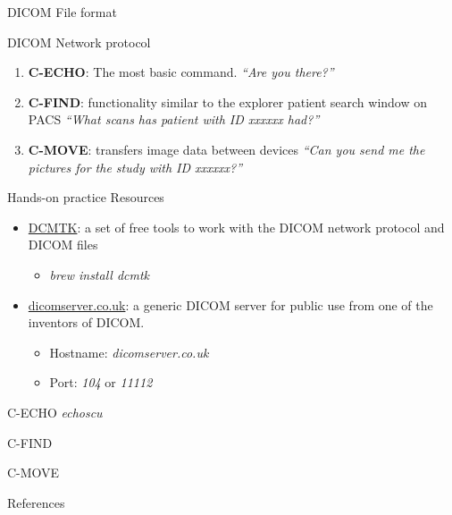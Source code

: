 \documentclass{beamer}
\begin{document}
\begin{frame}{DICOM File format}
\end{frame}

\begin{frame}{DICOM Network protocol}
    \begin{enumerate}
        \item{\textbf{C-ECHO}: The most basic command. \textit{``Are you there?''}}
        \item{\textbf{C-FIND}: functionality similar to the explorer patient search window on PACS \textit{``What scans has patient with ID xxxxxx had?''}}
        \item{\textbf{C-MOVE}: transfers image data between devices \textit{``Can you send me the pictures for the study with ID xxxxxx?''}}
    \end{enumerate}
\end{frame}

\begin{frame}{Hands-on practice}
    Resources
    \begin{itemize}
        \item{\href{https://dcmtk.org/}{DCMTK}: a set of free tools to work with the DICOM network protocol and DICOM files}
            \begin{itemize}
                \item{\textit{brew install dcmtk}}
            \end{itemize}
        \item{\href{https://dicomserver.co.uk/}{dicomserver.co.uk}: a generic DICOM server for public use from one of the inventors of DICOM}.
            \begin{itemize}
                \item{Hostname: \textit{dicomserver.co.uk}}
                \item{Port: \textit{104 } or \textit{11112}}
            \end{itemize}
    \end{itemize}
\end{frame}

\begin{frame}{C-ECHO}
    \textit{echoscu}
\end{frame}

\begin{frame}{C-FIND}
\end{frame}

\begin{frame}{C-MOVE}
\end{frame}

\begin{frame}{References}
    \renewcommand*{\bibfont}{\tiny}
    \printbibliography{}
\end{frame}
\end{document}
